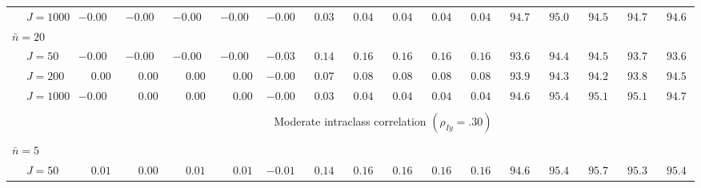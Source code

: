 \begin{sidewaystable}
\begin{threeparttable}
\begin{tabular}{llccccccccccccccc}
 & \nopagebreak $\;J=1000$  & ${-}0.00\phantom{0}$ & ${-}0.00\phantom{0}$ & ${-}0.00\phantom{0}$ & ${-}0.00\phantom{0}$ & ${-}0.00\phantom{0}$ & $\phantom{0}0.03\phantom{0}$ & $\phantom{0}0.04\phantom{0}$ & $\phantom{0}0.04\phantom{0}$ & $\phantom{0}0.04\phantom{0}$ & $\phantom{0}0.04\phantom{0}$ & $\phantom{0}94.7\phantom{0}$ & $\phantom{0}95.0\phantom{0}$ & $\phantom{0}94.5\phantom{0}$ & $\phantom{0}94.7\phantom{0}$ & $\phantom{0}94.6\phantom{0}$ \\
\multicolumn{4}{l}{$\bar{n}=20$} \\  & \nopagebreak $\;J=50$  & ${-}0.00\phantom{0}$ & ${-}0.00\phantom{0}$ & ${-}0.00\phantom{0}$ & ${-}0.00\phantom{0}$ & ${-}0.03\phantom{0}$ & $\phantom{0}0.14\phantom{0}$ & $\phantom{0}0.16\phantom{0}$ & $\phantom{0}0.16\phantom{0}$ & $\phantom{0}0.16\phantom{0}$ & $\phantom{0}0.16\phantom{0}$ & $\phantom{0}93.6\phantom{0}$ & $\phantom{0}94.4\phantom{0}$ & $\phantom{0}94.5\phantom{0}$ & $\phantom{0}93.7\phantom{0}$ & $\phantom{0}93.6\phantom{0}$ \\
 & \nopagebreak $\;J=200$  & $\phantom{-}0.00\phantom{0}$ & $\phantom{-}0.00\phantom{0}$ & $\phantom{-}0.00\phantom{0}$ & $\phantom{-}0.00\phantom{0}$ & ${-}0.00\phantom{0}$ & $\phantom{0}0.07\phantom{0}$ & $\phantom{0}0.08\phantom{0}$ & $\phantom{0}0.08\phantom{0}$ & $\phantom{0}0.08\phantom{0}$ & $\phantom{0}0.08\phantom{0}$ & $\phantom{0}93.9\phantom{0}$ & $\phantom{0}94.3\phantom{0}$ & $\phantom{0}94.2\phantom{0}$ & $\phantom{0}93.8\phantom{0}$ & $\phantom{0}94.5\phantom{0}$ \\
 & \nopagebreak $\;J=1000$  & ${-}0.00\phantom{0}$ & $\phantom{-}0.00\phantom{0}$ & $\phantom{-}0.00\phantom{0}$ & $\phantom{-}0.00\phantom{0}$ & ${-}0.00\phantom{0}$ & $\phantom{0}0.03\phantom{0}$ & $\phantom{0}0.04\phantom{0}$ & $\phantom{0}0.04\phantom{0}$ & $\phantom{0}0.04\phantom{0}$ & $\phantom{0}0.04\phantom{0}$ & $\phantom{0}94.6\phantom{0}$ & $\phantom{0}95.4\phantom{0}$ & $\phantom{0}95.1\phantom{0}$ & $\phantom{0}95.1\phantom{0}$ & $\phantom{0}94.7\phantom{0}$ \\
[0.5ex]\hline\\[-1.6ex] 
& & \multicolumn{15}{c}{Moderate intraclass correlation $(\rho_{Iy}=.30)$} \\[0.6ex]\hline\\[-1.8ex]
\multicolumn{4}{l}{$\bar{n}=5$} \\  & \nopagebreak $\;J=50$  & $\phantom{-}0.01\phantom{0}$ & $\phantom{-}0.00\phantom{0}$ & $\phantom{-}0.01\phantom{0}$ & $\phantom{-}0.01\phantom{0}$ & ${-}0.01\phantom{0}$ & $\phantom{0}0.14\phantom{0}$ & $\phantom{0}0.16\phantom{0}$ & $\phantom{0}0.16\phantom{0}$ & $\phantom{0}0.16\phantom{0}$ & $\phantom{0}0.16\phantom{0}$ & $\phantom{0}94.6\phantom{0}$ & $\phantom{0}95.4\phantom{0}$ & $\phantom{0}95.7\phantom{0}$ & $\phantom{0}95.3\phantom{0}$ & $\phantom{0}95.4\phantom{0}$ \\

\end{tabular}
\end{threeparttable}
\end{sidewaystable}
